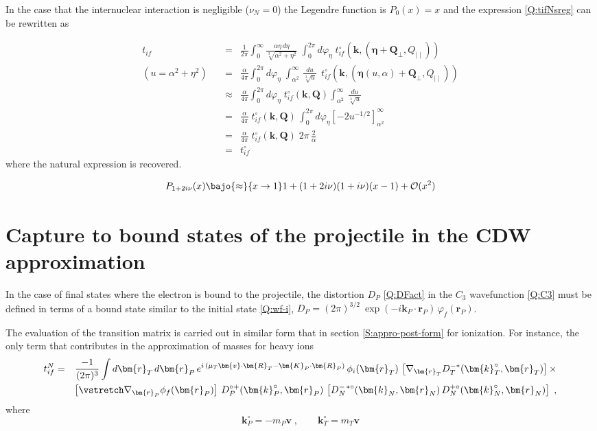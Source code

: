 In the case that the internuclear interaction is negligible ($\nu_{N}=0$) the
Legendre function is $P_{0}(x)=x$ and the expression \ref{Q:tifNsreg} can be
rewritten as

\begin{eqnarray*}
t_{if} &=& \frac{1}{2 \pi} \int_{0}^{\infty} \frac{\alpha \eta \, d
\eta}{\sqrt[3]{\alpha^{2}+ \eta^{2}}}  \;\int_{0}^{2 \pi} d \varphi_{\eta}
\;
t^{\circ}_{if}(\bm{k},(\bm{\eta}+\bm{Q}_{\perp},Q_{\mid  \mid })) \\
(u = \alpha^{2}+ \eta^{2}) \quad &=&  \frac{\alpha}{4 \pi} \int_{0}^{2 \pi}
d \varphi_{\eta} \; \int_{\alpha^{2}}^{\infty} \, \frac{d u
}{\sqrt[3]{u}}
\;\, t^{\circ}_{if}(\bm{k},(\bm{\eta}(u,\alpha) + \bm{Q}_{\perp},Q_{\mid  \mid }))
\\
&\approx&  \frac{\alpha}{4 \pi} \int_{0}^{2 \pi} d \varphi_{\eta} \;
t^{\circ}_{if}(\bm{k},\bm{Q}) \int_{\alpha^{2}}^{\infty} \, \frac{d u
} {\sqrt[3]{u}} \\
&=&  \frac{\alpha}{4 \pi} \; t^{\circ}_{if}(\bm{k}, \bm{Q}) \, \int_{0}^{2 \pi}
d \varphi_{\eta} \left[ - 2 u^{-1/2}\right]_{\alpha^{2}}^{\infty} \\
&=&  \frac{\alpha}{4 \pi} \; t^{\circ}_{if}(\bm{k}, \bm{Q}) \; 2 \pi \,
\frac{2}{\alpha} \\
&=& t^{\circ}_{if}
\end{eqnarray*}
%
where the natural expression is recovered.

\[
P_{1 + 2 i \nu} (x) \bajo{\approx}{x \to 1} 1 + (1+ 2 i \nu)(1 + i
\nu) (x-1) + \mathcal{O}(x^{2})
\]

%
\section{Capture to bound states of the projectile in the CDW approximation}

In the case of final states where the electron is bound to the projectile,
the distortion $D_{P}$ \ref{Q:DFact} in the $C_{3}$ wavefunction \ref{Q:C3}
must be defined in terms of a bound state similar to the initial state
\ref{Q:wf-i}, $D_{P}=(2 \pi)^{3/2}\ \exp{\left(- i \bm{k}_{P} \cdot
\bm{r}_{P} \right)} \, \varphi_{f} (\bm{r}_{P})$.

The evaluation of the transition matrix is carried out in similar form that
in section \ref{S:appro-post-form} for ionization. For instance, the only
term that contributes in the approximation of masses for heavy ions
\begin{eqnarray} \label{Q:tif-N-cpt}
t^{N}_{if} &=& \frac{-1}{(2 \pi)^{3}}  \int d \bm{r}_{T} \,d \bm{r}_{P}
\, e^{i \, ( \mu_{T}\bm{v} \cdot \bm{R}_{T} - \bm{K}_{P}  \cdot
\bm{R}_{P} ) }\, \phi_{i}(\bm{r}_T) \,\left[ \nabla_{\bm{r}_{T}}
D^{-*}_{T}(\bm{k}^{\circ}_{T},\bm{r}_T) \right] {\times}
\\
&&  \left[ \vstretch \nabla_{\bm{r}_{P}} \phi_{f}(\bm{r}_{P}) \right] \,
D^{\circ +}_{P} (\bm{k}_{P}^{\circ},\bm{r}_{P}) \, \left[ D^{-\,\ast
\circ}_{N}(\bm{k}_{N}, \bm{r}_{N} ) \, D^{+ \circ }_{N}
(\bm{k}_{N}^{\circ},\bm{r}_{N}) \right] \; , \nonumber
\end{eqnarray}
where
\[
\bm{k}_{P}^{\circ} = - m_{P} \bm{v} \; , \qquad \bm{k}^{\circ}_{T} = m_{T} \bm{v}
\]


